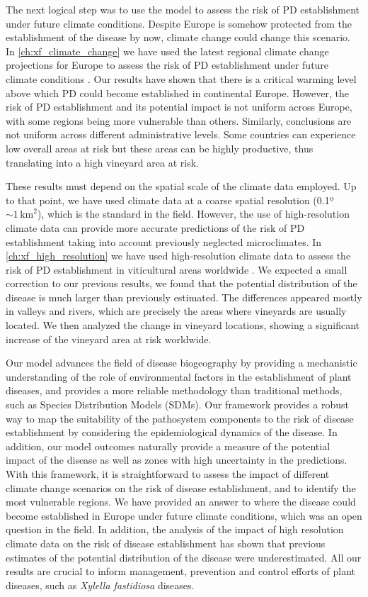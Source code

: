 The next logical step was to use the model to assess the risk of PD
establishment under future climate conditions. Despite Europe is somehow
protected from the establishment of the disease by now, climate change could
change this scenario. In \cref{ch:xf_climate_change} we have used the latest
regional climate change projections for Europe to assess the risk of PD
establishment under future climate conditions \cite{GimenezRomero2023_PD}.
Our results have shown that there is a critical warming level above which PD
could become established in continental Europe. However, the risk of PD
establishment and its potential impact is not uniform across Europe, with some
regions being more vulnerable than others. Similarly, conclusions are not
uniform across different administrative levels. Some countries can experience
low overall areas at risk but these areas can be highly productive, thus
translating into a high vineyard area at risk.

These results must depend on the spatial scale of the climate data employed. Up
to that point, we have used climate data at a coarse spatial resolution
(0.1º$\sim 1 \, \textrm{km}^2$), which is the standard in the field.
However, the use of high-resolution climate data can provide more accurate
predictions of the risk of PD establishment taking into account previously
neglected microclimates. In \cref{ch:xf_high_resolution} we have used
high-resolution climate data to assess the risk of PD establishment in
viticultural areas worldwide \cite{GimenezRomero2024}. We expected a small
correction to our previous results, we found that the potential distribution of
the disease is much larger than previously estimated. The differences appeared
mostly in valleys and rivers, which are precisely the areas where vineyards are
usually located. We then analyzed the change in vineyard locations, showing a
significant increase of the vineyard area at risk worldwide.

Our model advances the field of disease biogeography by providing a mechanistic
understanding of the role of environmental factors in the establishment of
plant diseases, and provides a more reliable methodology than traditional
methods, such as Species Distribution Models (SDMs). Our framework
provides a robust way to map the suitability of the pathosystem components to
the risk of disease establishment by considering the  epidemiological dynamics
of the disease. In addition, our model outcomes naturally provide a measure of
the potential impact of the disease as well as zones with high uncertainty in
the predictions. With this framework, it is straightforward to assess the
impact of different climate change scenarios on the risk of disease
establishment, and to identify the most vulnerable regions. We have provided an
answer to where the disease could become established in Europe under future
climate conditions, which was an open question in the field. In addition, the
analysis of the impact of high resolution climate data on the risk of disease
establishment has shown that previous estimates of the potential distribution
of the disease were underestimated. All our results are crucial to inform
management, prevention and control efforts of plant diseases, such as
\textit{Xylella fastidiosa} diseases.

